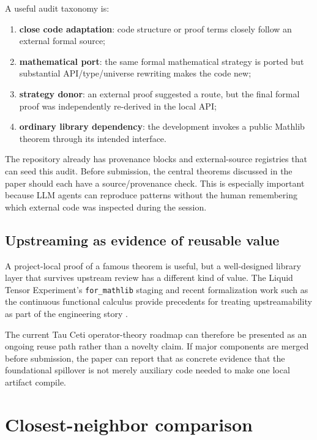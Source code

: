 \documentclass[11pt]{article}
\newcommand{\TauCeti}{Tau Ceti}
\begin{document}
A useful audit taxonomy is:

\begin{enumerate}
  \item \textbf{close code adaptation}: code structure or proof terms closely
        follow an external formal source;
  \item \textbf{mathematical port}: the same formal mathematical strategy is
        ported but substantial API/type/universe rewriting makes the code new;
  \item \textbf{strategy donor}: an external proof suggested a route, but the
        final formal proof was independently re-derived in the local API;
  \item \textbf{ordinary library dependency}: the development invokes a public
        Mathlib theorem through its intended interface.
\end{enumerate}

The repository already has provenance blocks and external-source registries that
can seed this audit.  Before submission, the central theorems discussed in the
paper should each have a source/provenance check.  This is especially important
because LLM agents can reproduce patterns without the human remembering which
external code was inspected during the session.

\subsection{Upstreaming as evidence of reusable value}

A project-local proof of a famous theorem is useful, but a well-designed library
layer that survives upstream review has a different kind of value.  The Liquid
Tensor Experiment's \texttt{for\_mathlib} staging and recent formalization work
such as the continuous functional calculus provide precedents for treating
upstreamability as part of the engineering story
\citep{liquidblueprint2023,dedecker2025cfc}.

The current \TauCeti{} operator-theory roadmap can therefore be presented as an
ongoing reuse path rather than a novelty claim.  If major components are merged
before submission, the paper can report that as concrete evidence that the
foundational spillover is not merely auxiliary code needed to make one local
artifact compile.

\section{Closest-neighbor comparison}
\label{sec:neighbors}
\end{document}
